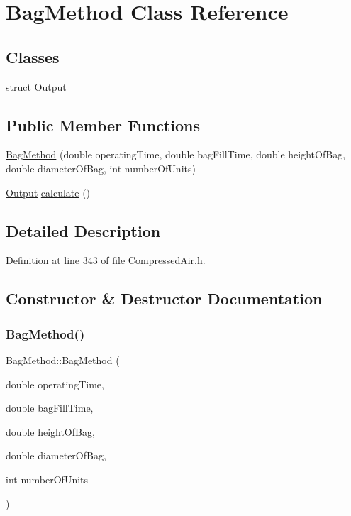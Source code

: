 \hypertarget{class_bag_method}{}\section{Bag\+Method Class Reference}
\label{class_bag_method}
\subsection*{Classes}
\begin{DoxyCompactItemize}
\item 
struct \hyperlink{struct_bag_method_1_1_output}{Output}
\end{DoxyCompactItemize}
\subsection*{Public Member Functions}
\begin{DoxyCompactItemize}
\item 
\hyperlink{class_bag_method_ade40cf50da337fb5f83aae1d72698b56}{Bag\+Method} (double operating\+Time, double bag\+Fill\+Time, double height\+Of\+Bag, double diameter\+Of\+Bag, int number\+Of\+Units)
\item 
\hyperlink{struct_bag_method_1_1_output}{Output} \hyperlink{class_bag_method_ab0a8d6b47bf81afbef47d8aaf1c1943c}{calculate} ()
\end{DoxyCompactItemize}


\subsection{Detailed Description}


Definition at line 343 of file Compressed\+Air.\+h.



\subsection{Constructor \& Destructor Documentation}
\mbox{\label{class_bag_method_ade40cf50da337fb5f83aae1d72698b56}} 
\subsubsection{\texorpdfstring{Bag\+Method()}{BagMethod()}}
{\footnotesize\ttfamily Bag\+Method\+::\+Bag\+Method (\begin{DoxyParamCaption}\item[{double}]{operating\+Time,  }\item[{double}]{bag\+Fill\+Time,  }\item[{double}]{height\+Of\+Bag,  }\item[{double}]{diameter\+Of\+Bag,  }\item[{int}]{number\+Of\+Units }\end{DoxyParamCaption})}

